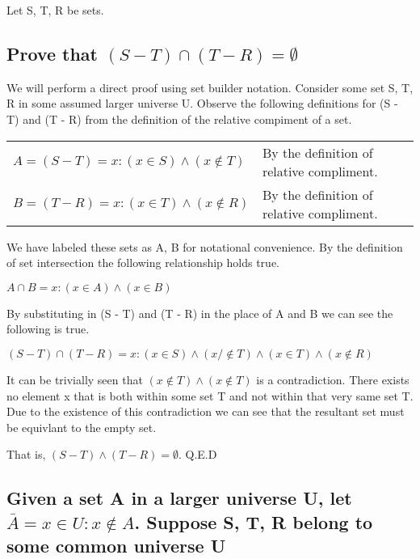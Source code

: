 Let S, T, R be sets.

\subsection{Prove that $(S - T) \cap (T - R) = \emptyset$}

We will perform a direct proof using set builder notation. Consider some set
S, T, R in some assumed larger universe U. Observe the following definitions for
(S - T) and (T - R) from the definition of the relative compiment of a set.

\begin{center}
\begin{tabular}{ll}
    $A = (S - T) = {x : (x \in S) \land (x \notin T)}$ & By the definition of relative compliment. \\
    $B = (T - R) = {x : (x \in T) \land (x \notin R)}$ & By the definition of relative compliment. \\
\end{tabular}
\end{center}

We have labeled these sets as A, B for notational convenience. By the definition
of set intersection the following relationship holds true.

\begin{center}
    $ A \cap B = {x : (x \in A) \land (x \in B)} $
\end{center}

By substituting in (S - T) and (T - R) in the place of A and B we can see the
following is true.

\begin{center}
    $(S - T) \cap (T - R) = {x : (x \in S) \land (x /\notin T) \land (x \in T) \land (x \notin R)} $
\end{center}

It can be trivially seen that $(x \notin T) \land (x \notin T)$ is a contradiction. There exists
no element x that is both within some set T and not within that very same set
T. Due to the existence of this contradiction we can see that the resultant set
must be equivlant to the empty set.

That is, $(S - T) \land (T - R) = \emptyset$. Q.E.D

\subsection{Given a set A in a larger universe U, let $\bar{A} = {x \in U : x \notin A}$. Suppose
S, T, R belong to some common universe U}

